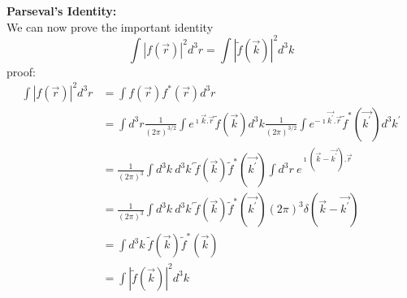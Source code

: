 		\textbf{Parseval's Identity:}\\
		We can now  prove the important identity
		\begin{equation}\label{eqn:118}
			\int |f(\vec{r})|^2 d^3r = \int |\tilde{f}(\vec{k})|^2 d^3k
		\end{equation}
		proof:
		\begin{eqnarray}
			\int |f(\vec{r})|^2 d^3r
			&= \int f(\vec{r}) f^*(\vec{r}) d^3r \nonumber \\
			&= \int d^3r \frac{1}{(2\pi)^{3/2}} \int e^{\imath\vec{k} . \vec{r}} \tilde{f}(\vec{k}) d^3k \frac{1}{(2\pi)^{3/2}} \int e^{-\imath\vec{k^\prime} . \vec{r}} \tilde{f}^*(\vec{k^\prime}) d^3k^\prime \nonumber \\
			&= \frac{1}{(2\pi)^3} \int d^3k\ d^3k^\prime \tilde{f}(\vec{k}) \tilde{f}^*(\vec{k^\prime}) \int d^3r \ e^{\imath(\vec{k} - \vec{k^\prime}).\vec{r}} \nonumber \\
			&= \frac{1}{(2\pi)^3} \int d^3k\ d^3k^\prime \tilde{f}(\vec{k}) \tilde{f}^*(\vec{k^\prime}) (2\pi)^3 \delta(\vec{k} - \vec{k^\prime}) \nonumber \\
			&= \int d^3k\ \tilde{f}(\vec{k}) \tilde{f}^*(\vec{k}) \nonumber \\
			&= \int |\tilde{f}(\vec{k})|^2 d^3k
		\end{eqnarray}
		
		
		
		
		